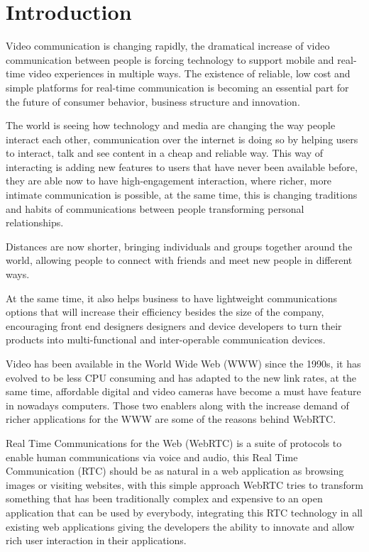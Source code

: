 \section{Introduction}

\thispagestyle{empty}

Video communication is changing rapidly, the dramatical increase of video communication between people is forcing technology to support mobile and real-time video experiences in multiple ways. The existence of reliable, low cost and simple platforms for real-time communication is becoming an essential part for the future of consumer behavior, business structure and innovation.

The world is seeing how technology and media are changing the way people interact each other, communication over the internet is doing so by helping users to interact, talk and see content in a cheap and reliable way. This way of interacting is adding new features to users that have never been available before, they are able now to have high-engagement interaction, where richer, more intimate communication is possible, at the same time, this is changing traditions and habits of communications between people transforming personal relationships. 

Distances are now shorter, bringing individuals and groups together around the world, allowing people to connect with friends and meet new people in different ways.

At the same time, it also helps business to have lightweight communications options that will increase their efficiency besides the size of the company, encouraging front end designers designers and device developers to turn their products into multi-functional and inter-operable communication devices.

Video has been available in the World Wide Web (WWW) since the 1990s, it has evolved to be less CPU consuming and has adapted to the new link rates, at the same time, affordable digital and video cameras have become a must have feature in nowadays computers. Those two enablers along with the increase demand of richer applications for the WWW are some of the reasons behind WebRTC.

Real Time Communications for the Web (WebRTC) is a suite of protocols to enable human communications via voice and audio, this Real Time Communication (RTC) should be as natural in a web application as browsing images or visiting websites, with this simple approach WebRTC tries to transform something that has been traditionally complex and expensive to an open application that can be used by everybody, integrating this RTC technology in all existing web applications giving the developers the ability to innovate and allow rich user interaction in their applications.

